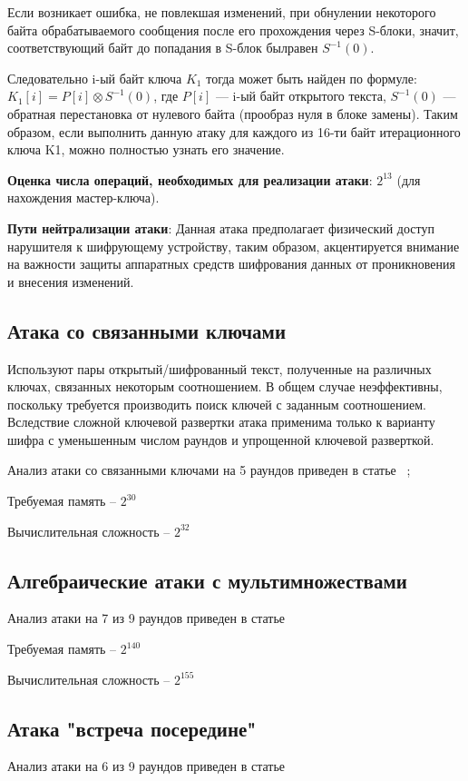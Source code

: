 \documentclass[colorthm]{../civarticle}
\begin{document}
Если возникает ошибка, не повлекшая изменений, при обнулении некоторого байта обрабатываемого сообщения после его прохождения через S-блоки, значит, соответствующий байт до попадания в S-блок былравен $S^{−1}(0)$.

Следовательно i-ый байт ключа $K_1$ тогда может быть найден по формуле:
$K_1[i] = P[i] \otimes S^{−1}(0)$, 
где $P[i]$ — i-ый байт открытого текста, $S^{−1}(0)$ — обратная перестановка
от нулевого байта (прообраз нуля в блоке замены).
Таким образом, если выполнить данную атаку для каждого из 16-ти
байт итерационного ключа K1, можно полностью узнать его значение.

\textbf{Оценка числа операций, необходимых для реализации атаки}: $2^{13}$ (для нахождения мастер-ключа).

\textbf{Пути нейтрализации атаки}: Данная атака предполагает физический доступ нарушителя к шифрующему устройству, таким образом, акцентируется внимание на важности защиты аппаратных средств шифрования данных от проникновения и внесения изменений.



\subsection{Атака со связанными ключами}
Используют пары открытый/шифрованный текст, полученные на различных ключах, связанных некоторым соотношением.
В общем случае неэффективны, поскольку требуется производить поиск ключей с
заданным соотношением.
Вследствие сложной ключевой развертки атака применима только к варианту шифра с уменьшенным числом раундов и упрощенной ключевой разверткой.

Анализ атаки со связанными ключами на 5 раундов приведен в статье ~\cite{atack2};

Требуемая память – $2^{30}$

Вычислительная сложность – $2^{32}$

\subsection{Алгебраические атаки с мультимножествами}
Анализ атаки на 7 из 9 раундов приведен в статье ~\cite{atack3}

Требуемая память – $2^{140}$

Вычислительная сложность – $2^{155}$

\subsection{Атака "встреча посередине"\ }
Анализ атаки на 6 из 9 раундов приведен в статье ~\cite{atack4}
\end{document}
